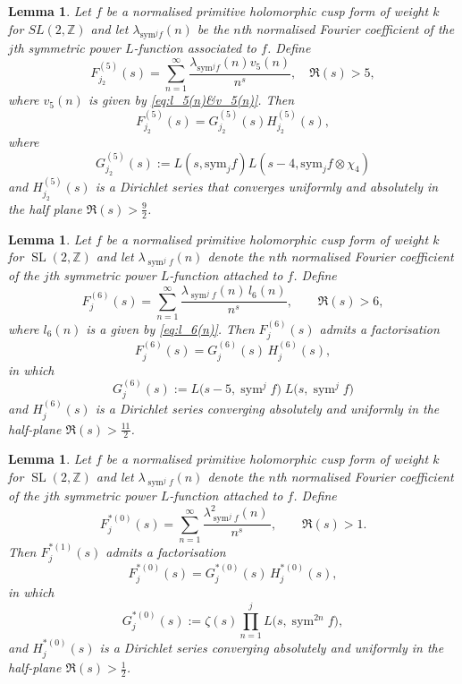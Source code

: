 \documentclass[10pt]{amsart}
\newtheorem{lemma}[theorem]{Lemma}
\begin{document}
\begin{lemma}\label{lem:F5''}
        Let $f$ be a normalised primitive holomorphic cusp form of weight $k$ for $SL(2,\mathbb{Z})$ and let $\lambda_{\mathrm{sym}^{j}f}(n)$ be the $n$th normalised Fourier coefficient of the $j$th symmetric power $L$-function associated to $f$. Define
        \[
        F_{j_2}^{(5)}(s)=\sum_{n=1}^{\infty}\frac{\lambda_{\mathrm{sym}^{j}f}(n)v_5(n)}{n^{s}}, \quad \Re(s) > 5,
        \]
        where $v_5(n)$ is given by \eqref{eq:l_5(n)&v_5(n)}. Then
        \[
        F_{j_2}^{(5)}(s)=G_{j_2}^{(5)}(s)H_{j_2}^{(5)}(s),
        \]
        where
        \[
        G_{j_2}^{(5)}(s):=L(s, \mathrm{sym}_{j}f)L(s-4,\mathrm{sym}_jf \otimes\chi_4)
        \]
        and $H_{j_2}^{(5)}(s)$ is a Dirichlet series that converges uniformly and absolutely in the half plane $\Re(s)>\frac{9}{2}$.
    \end{lemma}

\begin{lemma}\label{lem:F6}
Let \(f\) be a normalised primitive holomorphic cusp form of weight \(k\) for \(\operatorname{SL}(2,\mathbb{Z})\) and let \(\lambda_{\operatorname{sym}^{j}f}(n)\) denote the \(n\)th normalised Fourier coefficient 
of the \(j\)th symmetric power \(L\)-function attached to \(f\). Define
\[
F_{j}^{(6)}(s)=\sum_{n=1}^{\infty}\frac{\lambda_{\operatorname{sym}^{j}f}(n)\,l_6(n)}{n^{s}}, \qquad \Re(s)>6,
\]
where \(l_6(n)\) is a given by \eqref{eq:l_6(n)}. Then \(F_{j}^{(6)}(s)\) admits a factorisation
\[
F_{j}^{(6)}(s)=G_{j}^{(6)}(s)\,H_{j}^{(6)}(s),
\]
in which 
\[
G_{j}^{(6)}(s):=L\!\bigl(s-5,\operatorname{sym}^{j}f\bigr)\; 
        L\!\bigl(s,\operatorname{sym}^{j}f\bigr)
\]
and \(H_{j}^{(6)}(s)\) is a Dirichlet series converging absolutely and uniformly 
in the half-plane \(\Re(s)>\frac{11}{2}\).
\end{lemma}

\begin{lemma} \label{lem:F0*}
Let \(f\) be a normalised primitive holomorphic cusp form of weight \(k\) for \(\operatorname{SL}(2,\mathbb{Z})\)
and let \(\lambda_{\operatorname{sym}^{j}f}(n)\) denote the \(n\)th normalised Fourier coefficient 
of the \(j\)th symmetric power \(L\)-function attached to \(f\). Define
\[
F_{j}^{*(0)}(s)=\sum_{n=1}^{\infty}\frac{\lambda_{\operatorname{sym}^{j}f}^2(n)\,}{n^{s}}, \qquad \Re(s)>1.
\]  
Then \(F_{j}^{*(1)}(s)\) admits a factorisation
\[
F_{j}^{*(0)}(s)=G_{j}^{*(0)}(s)\,H_{j}^{*(0)}(s),
\]
in which
\[
G_{j}^{*(0)}(s):=\zeta(s)\prod_{n=1}^{j}L\!\bigl(s,\operatorname{sym}^{2n}f \bigr),
\] 
and \(H_{j}^{*(0)}(s)\) is a Dirichlet series converging absolutely and uniformly 
in the half-plane \(\Re(s)>\frac{1}{2}\).
\end{lemma}
\end{document}
